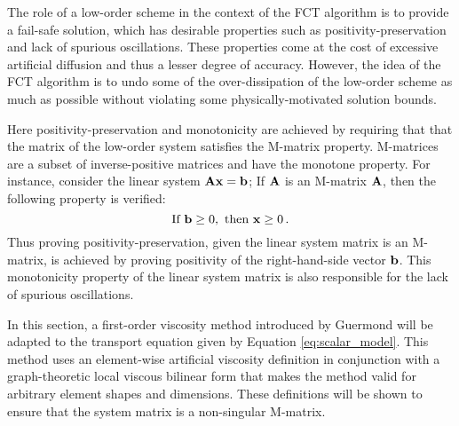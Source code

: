 
The role of a low-order scheme in the context of the FCT algorithm is to
provide a fail-safe solution, which has desirable properties such as
positivity-preservation and lack of spurious oscillations. These properties
come at the cost of excessive artificial diffusion and thus a lesser degree
of accuracy. However, the idea of the FCT algorithm is to undo some of the over-dissipation 
of the low-order scheme as much as possible without violating some physically-motivated solution bounds.

Here positivity-preservation and monotonicity are achieved by 
requiring that that the matrix of the low-order system satisfies the M-matrix property.
M-matrices are a subset of inverse-positive matrices and have the monotone
property. For instance, consider the linear system $\mathbf{A}\mathbf{x} = \mathbf{b}$;
If $\mathbf{A}$ is an M-matrix $\mathbf{A}$, then the following property is verified:
\begin{equation}
\text{If }  \mathbf{b} \geq 0, \text{  then  }  \mathbf{x} \geq 0 \,.
\end{equation}
Thus proving positivity-preservation, given the linear system matrix is an
M-matrix, is achieved by proving positivity of the right-hand-side vector $\mathbf{b}$.
This monotonicity property of the linear system matrix is also responsible for
the lack of spurious oscillations.

In this section, a first-order viscosity method introduced by Guermond
\cite{guermond_firstorder} will be adapted to the transport equation given by
Equation \eqref{eq:scalar_model}. This method uses an element-wise artificial
viscosity definition in conjunction with a graph-theoretic local viscous
bilinear form that makes the method valid for arbitrary element shapes and
dimensions. These definitions will be shown to ensure that the system matrix
is a non-singular M-matrix.


